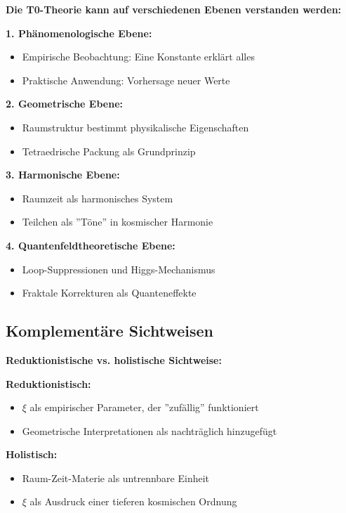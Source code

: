 \documentclass[12pt,a4paper]{article}
\begin{document}
	\begin{foundation}
		\textbf{Die T0-Theorie kann auf verschiedenen Ebenen verstanden werden:}
		
		\textbf{1. Phänomenologische Ebene:}
		\begin{itemize}
			\item Empirische Beobachtung: Eine Konstante erklärt alles
			\item Praktische Anwendung: Vorhersage neuer Werte
		\end{itemize}
		
		\textbf{2. Geometrische Ebene:}
		\begin{itemize}
			\item Raumstruktur bestimmt physikalische Eigenschaften
			\item Tetraedrische Packung als Grundprinzip
		\end{itemize}
		
		\textbf{3. Harmonische Ebene:}
		\begin{itemize}
			\item Raumzeit als harmonisches System
			\item Teilchen als ''Töne'' in kosmischer Harmonie
		\end{itemize}
		
		\textbf{4. Quantenfeldtheoretische Ebene:}
		\begin{itemize}
			\item Loop-Suppressionen und Higgs-Mechanismus
			\item Fraktale Korrekturen als Quanteneffekte
		\end{itemize}
	\end{foundation}
	
	\subsection{Komplementäre Sichtweisen}
	
	\begin{alternative}
		\textbf{Reduktionistische vs. holistische Sichtweise:}
		
		\textbf{Reduktionistisch:}
		\begin{itemize}
			\item $\xi$ als empirischer Parameter, der ''zufällig'' funktioniert
			\item Geometrische Interpretationen als nachträglich hinzugefügt
		\end{itemize}
		
		\textbf{Holistisch:}
		\begin{itemize}
			\item Raum-Zeit-Materie als untrennbare Einheit
			\item $\xi$ als Ausdruck einer tieferen kosmischen Ordnung
		\end{itemize}
	\end{alternative}
	
\end{document}
